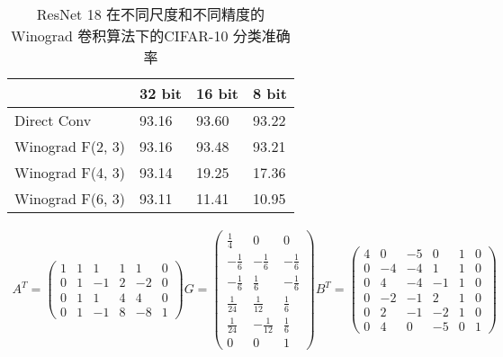 \begin{table}[]
\centering
\caption{ResNet 18 在不同尺度和不同精度的Winograd 卷积算法下的CIFAR-10 分类准确率}
\begin{tabular}{llll}
\hline
\multicolumn{1}{|l|}{}                 & \multicolumn{1}{l|}{32 bit} & \multicolumn{1}{l|}{16 bit} & \multicolumn{1}{l|}{8 bit} \\ \hline
\multicolumn{1}{|l|}{Direct  Conv}     & \multicolumn{1}{l|}{93.16}  & \multicolumn{1}{l|}{93.60}  & \multicolumn{1}{l|}{93.22} \\ \hline
\multicolumn{1}{|l|}{Winograd F(2, 3)} & \multicolumn{1}{l|}{93.16}  & \multicolumn{1}{l|}{93.48}  & \multicolumn{1}{l|}{93.21} \\ \hline
\multicolumn{1}{|l|}{Winograd F(4, 3)} & \multicolumn{1}{l|}{93.14}  & \multicolumn{1}{l|}{19.25}  & \multicolumn{1}{l|}{17.36} \\ \hline
\multicolumn{1}{|l|}{Winograd F(6, 3)} & \multicolumn{1}{l|}{93.11}  & \multicolumn{1}{l|}{11.41}  & \multicolumn{1}{l|}{10.95} \\ \hline
\end{tabular}
\label{tbl:winograd_acc}
\end{table}
\begin{align}
\label{eq:winograd_f43}
  A^T = 
  \begin{pmatrix}
      1 & 1 & 1 &  1 &  1 &  0\\
      0 & 1 & -1&  2 &  -2&  0\\
      0 & 1 & 1 &  4 &  4 &  0\\
      0 & 1 & -1&  8 &  -8&  1
  \end{pmatrix}
  G = 
  \begin{pmatrix}
    \frac{1}{4} & 0 & 0 \\
    -\frac{1}{6} & -\frac{1}{6} & -\frac{1}{6} \\
    -\frac{1}{6} & \frac{1}{6} & -\frac{1}{6} \\
    \frac{1}{24} & \frac{1}{12} & \frac{1}{6} \\
    \frac{1}{24} & -\frac{1}{12} & \frac{1}{6} \\
    0 & 0 & 1
  \end{pmatrix}
  B^T =
  \begin{pmatrix}
    4  & 0 &  -5 & 0  &  1&  0\\
    0  & -4&  -4 & 1  &  1&  0\\
    0  & 4 &  -4 & -1 &  1&  0\\
    0  & -2&  -1 & 2  &  1&  0\\
    0  & 2 &  -1 & -2 &  1&  0\\
    0  & 4 &  0  & -5 &  0&  1
  \end{pmatrix}
\end{align}

